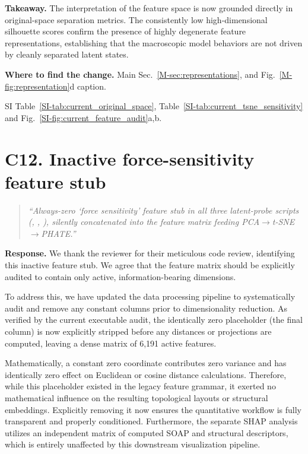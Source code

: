 \documentclass[11pt]{article}
\newcommand{\location}[2]{\par{\small\textbf{Where to find the change.} #1\par #2}\par}
\begin{document}
\textbf{Takeaway.} The interpretation of the feature space is now grounded directly in original-space separation metrics. The consistently low high-dimensional silhouette scores confirm the presence of highly degenerate feature representations, establishing that the macroscopic model behaviors are not driven by cleanly separated latent states.
\location{Main Sec.~\ref{M-sec:representations}, and Fig.~\ref{M-fig:representation}d caption.}{SI Table~\ref{SI-tab:current_original_space}, Table~\ref{SI-tab:current_tsne_sensitivity} and Fig.~\ref{SI-fig:current_feature_audit}a,b.}

\section*{C12. Inactive force-sensitivity feature stub}

\begin{quote}\small \itshape
``Always-zero `force sensitivity' feature stub in all three latent-probe scripts (, , ), silently concatenated into the feature matrix feeding PCA$\rightarrow$t-SNE$\rightarrow$PHATE.''\end{quote}

\textbf{Response.} 
We thank the reviewer for their meticulous code review, identifying this inactive feature stub. We agree that the feature matrix should be explicitly audited to contain only active, information-bearing dimensions.

To address this, we have updated the data processing pipeline to systematically audit and remove any constant columns prior to dimensionality reduction. As verified by the current executable audit, the identically zero placeholder (the final column) is now explicitly stripped before any distances or projections are computed, leaving a dense matrix of 6,191 active features.

Mathematically, a constant zero coordinate contributes zero variance and has identically zero effect on Euclidean or cosine distance calculations. Therefore, while this placeholder existed in the legacy feature grammar, it exerted no mathematical influence on the resulting topological layouts or structural embeddings. Explicitly removing it now ensures the quantitative workflow is fully transparent and properly conditioned. Furthermore, the separate SHAP analysis utilizes an independent matrix of computed SOAP and structural descriptors, which is entirely unaffected by this downstream visualization pipeline.
\end{document}
